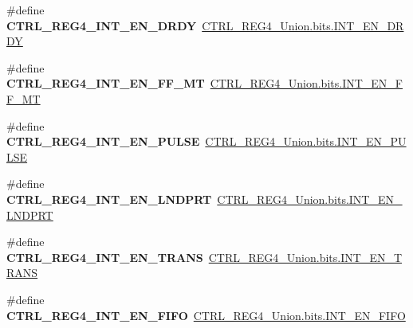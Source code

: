 \begin{DoxyCompactItemize}
\item 
\hypertarget{group__accel__module_ga14be1d8bc870cb9eb6b40252a30db82c}{}\#define {\bfseries C\+T\+R\+L\+\_\+\+R\+E\+G4\+\_\+\+I\+N\+T\+\_\+\+E\+N\+\_\+\+D\+R\+D\+Y}~\hyperlink{accel_8c_ae136349651ad32006a4ff81765056040}{C\+T\+R\+L\+\_\+\+R\+E\+G4\+\_\+\+Union.\+bits.\+I\+N\+T\+\_\+\+E\+N\+\_\+\+D\+R\+D\+Y}\label{group__accel__module_ga14be1d8bc870cb9eb6b40252a30db82c}

\item 
\hypertarget{group__accel__module_gafd165e78c0f3fd8ef68220f67ede39c5}{}\#define {\bfseries C\+T\+R\+L\+\_\+\+R\+E\+G4\+\_\+\+I\+N\+T\+\_\+\+E\+N\+\_\+\+F\+F\+\_\+\+M\+T}~\hyperlink{accel_8c_a3dc6e0a1e88d0554b76540c581dd4ca4}{C\+T\+R\+L\+\_\+\+R\+E\+G4\+\_\+\+Union.\+bits.\+I\+N\+T\+\_\+\+E\+N\+\_\+\+F\+F\+\_\+\+M\+T}\label{group__accel__module_gafd165e78c0f3fd8ef68220f67ede39c5}

\item 
\hypertarget{group__accel__module_ga13d90e1a77f7b00d514348002b1c01f2}{}\#define {\bfseries C\+T\+R\+L\+\_\+\+R\+E\+G4\+\_\+\+I\+N\+T\+\_\+\+E\+N\+\_\+\+P\+U\+L\+S\+E}~\hyperlink{accel_8c_afc7709cbf42105c1f160c383bbec2023}{C\+T\+R\+L\+\_\+\+R\+E\+G4\+\_\+\+Union.\+bits.\+I\+N\+T\+\_\+\+E\+N\+\_\+\+P\+U\+L\+S\+E}\label{group__accel__module_ga13d90e1a77f7b00d514348002b1c01f2}

\item 
\hypertarget{group__accel__module_ga095b51ada61480f54d3fc86d6b82cd92}{}\#define {\bfseries C\+T\+R\+L\+\_\+\+R\+E\+G4\+\_\+\+I\+N\+T\+\_\+\+E\+N\+\_\+\+L\+N\+D\+P\+R\+T}~\hyperlink{accel_8c_a27d25427dedad1ca7f49432d1845af73}{C\+T\+R\+L\+\_\+\+R\+E\+G4\+\_\+\+Union.\+bits.\+I\+N\+T\+\_\+\+E\+N\+\_\+\+L\+N\+D\+P\+R\+T}\label{group__accel__module_ga095b51ada61480f54d3fc86d6b82cd92}

\item 
\hypertarget{group__accel__module_ga7929a9c2e7d00122428e910087adfd80}{}\#define {\bfseries C\+T\+R\+L\+\_\+\+R\+E\+G4\+\_\+\+I\+N\+T\+\_\+\+E\+N\+\_\+\+T\+R\+A\+N\+S}~\hyperlink{accel_8c_ab9da2cde5dd847313bc367bc233d05e9}{C\+T\+R\+L\+\_\+\+R\+E\+G4\+\_\+\+Union.\+bits.\+I\+N\+T\+\_\+\+E\+N\+\_\+\+T\+R\+A\+N\+S}\label{group__accel__module_ga7929a9c2e7d00122428e910087adfd80}

\item 
\hypertarget{group__accel__module_ga2850b1c9df2623a1208e4e5902e2a963}{}\#define {\bfseries C\+T\+R\+L\+\_\+\+R\+E\+G4\+\_\+\+I\+N\+T\+\_\+\+E\+N\+\_\+\+F\+I\+F\+O}~\hyperlink{accel_8c_a783d7438bd94accd165bba7abe1ec520}{C\+T\+R\+L\+\_\+\+R\+E\+G4\+\_\+\+Union.\+bits.\+I\+N\+T\+\_\+\+E\+N\+\_\+\+F\+I\+F\+O}\label{group__accel__module_ga2850b1c9df2623a1208e4e5902e2a963}


\end{DoxyCompactItemize}

